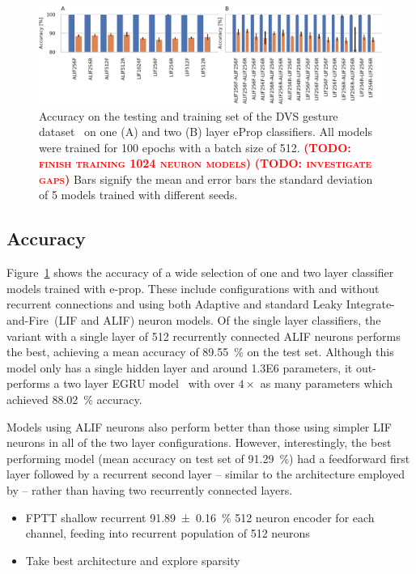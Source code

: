 \documentclass[sigconf]{acmart}
\newcommand{\todo}[1]{\textbf{\textsc{\textcolor{red}{(TODO: #1)}}}}
\begin{document}
\begin{figure}[t]
  \centering
  \includegraphics{figures/dense_accuracy.pdf}
  \caption{Accuracy on the testing and training set of the DVS gesture dataset~\citep{amir_low_2017} on one (A) and two (B) layer eProp classifiers.
  All models were trained for 100 epochs with a batch size of 512.
  \todo{finish training 1024 neuron models}
  \todo{investigate gaps}
  Bars signify the mean and error bars the standard deviation of 5 models trained with different seeds.}
  \label{fig:dense_accuracy}
\end{figure}

\subsection{Accuracy}
Figure~\ref{fig:dense_accuracy} shows the accuracy of a wide selection of one and two layer classifier models trained with e-prop.
These include configurations with and without recurrent connections and using both Adaptive and standard Leaky Integrate-and-Fire~(LIF and ALIF) neuron models.
Of the single layer classifiers, the variant with a single layer of 512 recurrently connected ALIF neurons performs the best, achieving a mean accuracy of \SI{89.55}{\percent} on the test set.
Although this model only has a single hidden layer and around \num{1.3E6} parameters, it out-performs a two layer EGRU model~\citep{subramoney2022egru} with over $4\times$ as many parameters which achieved \SI{88.02}{\percent} accuracy.

Models using ALIF neurons also perform better than those using simpler LIF neurons in all of the two layer configurations.
However, interestingly, the best performing model (mean accuracy on test set of \SI{91.29}{\percent}) had a feedforward first layer followed by a recurrent second layer  -- similar to the architecture employed by \citet{yin2021accurate} -- rather than having two recurrently connected layers.
\begin{itemize}
    \item FPTT shallow recurrent \SI{91.89 \pm 0.16}{\percent} 512 neuron encoder for each channel, feeding into recurrent population of 512 neurons
    \item Take best architecture and explore sparsity
\end{itemize}
\end{document}
